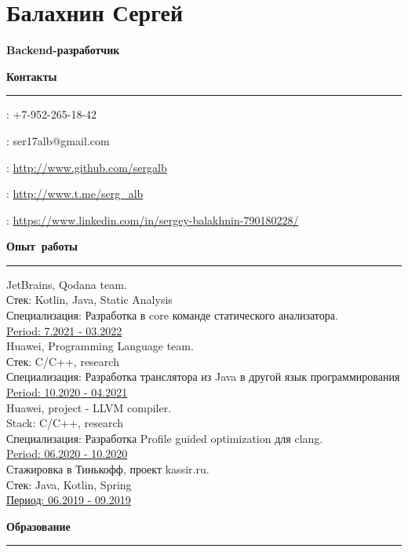 \documentclass[12pt, a4paper]{report}
\author{Балахнин Сергей}
\begin{document}
    \section*{Балахнин Сергей}

    {\large\textbf{Backend-разработчик}}

    \hbox{\large\textbf{Контакты}}\kern5pt\hrule\kern5pt

    \faPhone: +7-952-265-18-42

    \Letter: ser17alb@gmail.com

    \faGithub: \url{http://www.github.com/sergalb}

    \faSend: \url{http://www.t.me/serg_alb}

    \faLinkedinSquare: \url{https://www.linkedin.com/in/sergey-balakhnin-790180228/}\\


    \par\hbox{\large\textbf{Опыт работы}}\kern3pt\hrule\kern10pt
    JetBrains, Qodana team. \\
    Стек: Kotlin, Java, Static Analysis \\
    Специализация: Разработка в core команде статического анализатора.\\
    \underline{Period: 7.2021 - 03.2022} \\

    Huawei, Programming Language team. \\
    Стек: C/C++, research \\
    Специализация: Разработка транслятора из Java в другой язык программирования\\
    \underline{Period: 10.2020 - 04.2021} \\

    Huawei, project - LLVM compiler. \\
    Stack: C/C++, research \\
    Специализация: Разработка Profile guided optimization для clang.\\
    \underline{Period: 06.2020 - 10.2020} \\

    Стажировка в Тинькофф, проект kassir.ru. \\
    Стек: Java, Kotlin, Spring \\
    \underline{Период: 06.2019 - 09.2019} \\

    \par\hbox{\large\textbf{Образование}}\kern5pt\hrule\kern5pt
\end{document}
